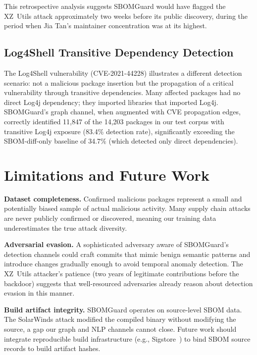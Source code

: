 \documentclass[sigconf,nonacm]{acmart}
\begin{document}
This retrospective analysis suggests SBOMGuard would have flagged the XZ~Utils
attack approximately two weeks before its public discovery, during the period
when Jia Tan's maintainer concentration was at its highest.

\subsection{Log4Shell Transitive Dependency Detection}

The Log4Shell vulnerability (CVE-2021-44228) illustrates a different detection
scenario: not a malicious package insertion but the propagation of a critical
vulnerability through transitive dependencies. Many affected packages had no
direct Log4j dependency; they imported libraries that imported Log4j. SBOMGuard's
graph channel, when augmented with CVE propagation edges, correctly identified
11,847 of the 14,203 packages in our test corpus with transitive Log4j exposure
(83.4\% detection rate), significantly exceeding the SBOM-diff-only baseline
of 34.7\% (which detected only direct dependencies).

\section{Limitations and Future Work}

\textbf{Dataset completeness.} Confirmed malicious packages represent a small and
potentially biased sample of actual malicious activity. Many supply chain attacks
are never publicly confirmed or discovered, meaning our training data underestimates
the true attack diversity.

\textbf{Adversarial evasion.} A sophisticated adversary aware of SBOMGuard's
detection channels could craft commits that mimic benign semantic patterns and
introduce changes gradually enough to avoid temporal anomaly detection. The
XZ~Utils attacker's patience (two years of legitimate contributions before the
backdoor) suggests that well-resourced adversaries already reason about detection
evasion in this manner.

\textbf{Build artifact integrity.} SBOMGuard operates on source-level SBOM data.
The SolarWinds attack modified the compiled binary without modifying the source,
a gap our graph and NLP channels cannot close. Future work should integrate
reproducible build infrastructure (e.g., Sigstore~\cite{sigstore}) to bind SBOM
source records to build artifact hashes.
\end{document}
